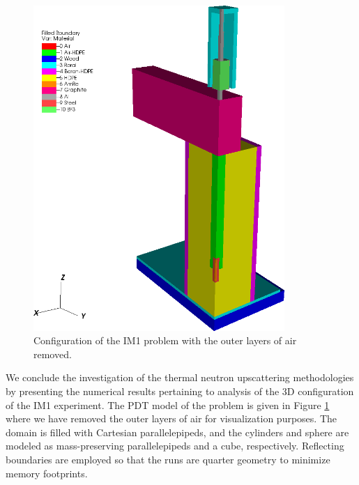 \begin{figure}
\centering
\includegraphics[width=0.85\textwidth]{figures/sec_DSA/IM1_configuration_Rev1.png}
\caption{Configuration of the IM1 problem with the outer layers of air removed.}
\label{fig::IM1_config_3D}
\end{figure}

We conclude the investigation of the thermal neutron upscattering methodologies by presenting the numerical results pertaining to analysis of the 3D configuration of the IM1 experiment. The PDT model of the problem is given in Figure \ref{fig::IM1_config_3D} where we have removed the outer layers of air for visualization purposes. The domain is filled with Cartesian parallelepipeds, and the cylinders and sphere are modeled as mass-preserving parallelepipeds and a cube, respectively. Reflecting boundaries are employed so that the runs are quarter geometry to minimize memory footprints.

